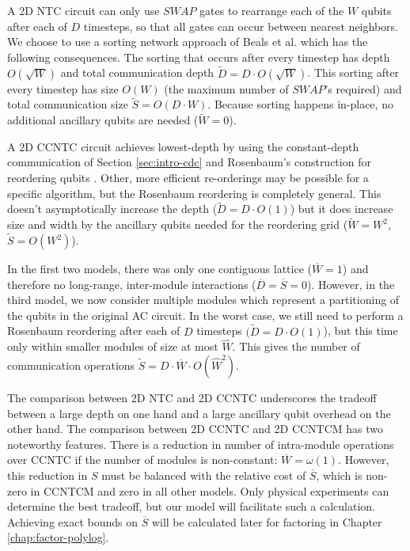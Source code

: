 A \textsf{2D NTC} circuit can only
use $SWAP$ gates to rearrange each of the $W$ qubits after each of $D$
timesteps, so that all gates can occur between nearest neighbors. We choose
to use a sorting network approach of Beals et al. \cite{Beals2012} which
has the following consequences. The sorting that occurs after every timestep
has depth $O(\sqrt{W})$ and total communication depth $\tilde{D} = D\cdot O(\sqrt{W})$.
This sorting after every timestep has size $O(W)$ (the maximum number
of $SWAP$'s required) and total communication size
$\tilde{S} = O(D\cdot W)$. Because sorting happens in-place,
no additional ancillary qubits are needed ($\tilde{W} = 0$). 

A \textsf{2D CCNTC} circuit achieves lowest-depth by using the constant-depth
communication of Section \ref{sec:intro-cdc} and Rosenbaum's
construction for reordering qubits \cite{Rosenbaum2012}. Other, more
efficient re-orderings may be possible for a specific algorithm, but
the Rosenbaum reordering is completely general. This doesn't
asymptotically increase the depth ($\tilde{D} = D\cdot O(1)$) but it does
increase size and width by the ancillary qubits needed for the reordering
grid ($\tilde{W} = W^2$, $\tilde{S} = O(W^2)$).

In the first two models, there was only one contiguous lattice
($\overline{W} = 1$) and therefore no long-range, inter-module interactions
($\overline{D} = \overline{S} = 0$). However, in the third model, we now
consider multiple modules which represent a partitioning of the qubits
in the original \textsf{AC} circuit. In the worst case, we still need to
perform a Rosenbaum reordering after each of $D$ timesteps $(\tilde{D} = D\cdot O(1)$), but this time
only within smaller modules of size at most $\hat{W}$. This gives the
number of communication operations $\tilde{S} = D\cdot \overline{W} \cdot O(\hat{W}^2)$.

The comparison between \textsf{2D NTC} and \textsf{2D CCNTC} underscores the
tradeoff between a large depth on one hand and a large ancillary qubit
overhead on the other hand.
The comparison between \textsf{2D CCNTC} and \textsf{2D CCNTCM} has two
noteworthy features.
There is a reduction in number of intra-module operations over \textsf{CCNTC} 
if the number of modules is non-constant:
$\overline{W} = \omega(1)$. However, this reduction in $S$ must be
balanced with the relative cost of $\overline{S}$, which is non-zero in
\textsf{CCNTCM} and zero in all other models.
Only physical experiments can determine the best tradeoff, but our
model will facilitate such a calculation. Achieving exact bounds on
$\overline{S}$ will be calculated later for factoring in Chapter
\ref{chap:factor-polylog}.

